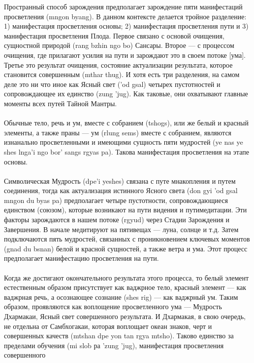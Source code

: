 \begin{siderules}
Пространный способ зарождения предполагает зарождение пяти манифестаций просветления
(mngon byang). В данном контексте делается тройное разделение: 1) манифестация
просветления основы; 2) манифестация просветления пути и 3) манифестация просветления
Плода. Первое связано с основой очищения, сущностной природой (rang bzhin ngo bo)
Сансары. Второе — с процессом очищения, где прилагают усилия на пути и зарождают это в
своем потоке [ума]. Третье  это результат очищения, состояние актуализации результата,
которое становится совершенным (mthar thug). И хотя есть три разделения, на самом деле это
ни что иное как Ясный свет ('od gsal) четырех пустотностей и сопровождающее их единство
(zung 'jug). Как таковые, они охватывают главные моменты всех путей Тайной Мантры.\\
\\
Обычные тело, речь и ум, вместе с собранием (tshogs), или же белый и красный элементы, а
также праны — ум (rlung sems) вместе с собранием, являются изнанально просветленными
и имеющими сущность пяти мудростей (ye nas ye shes lnga'i ngo bor' sangs rgyas pa). Такова
манифестация просветления на этапе основы.\\
\\
Символическая Мудрость (dpe'i yeshes) связана с путе мнакопления и путем соединения,
тогда как актуализация истинного Ясного света (don gyi 'od gsal mngon du byas pa)
предполагает четыре пустотности, сопровождающиеся единством (союзом), которые
возникают на пути видения и путимедитации. Эти факторы зарождаются в нашем потоке
(rgyud) через Стадии Зарождения и Завершения. В начале медитируют на пятивещах — луна,
солнце и т.д. Затем подключаются пять мудростей, связанных с проникновением ключевых
моментов (gnad du bsnan) белой и красной сущностей, а также ветра и ума. Этот процесс
предполагает манифестацию просветления на пути.\\
\\
Когда же достигают окончательного результата этого процесса, то белый элемент
естественным образом присутствует как ваджрное тело, красный элемент — как ваджрная
речь, а осознающее сознание (shes rig) — как ваджрный ум. Таким образом, проявляются как
воплощение просветленного ума — Мудрость Дхармакаи, Ясный свет совершенного
результата. И Дхармакая, в свою очередь, не отдельна от Самбхогакаи, которая воплощает
океан знаков, черт и совершенных качеств (mtshan dpe yon tan rgya mtsho). Таково единство
за пределами обучения (mi slob ра 'zung 'jug), манифестация просветления совершенного

\end{siderules}
